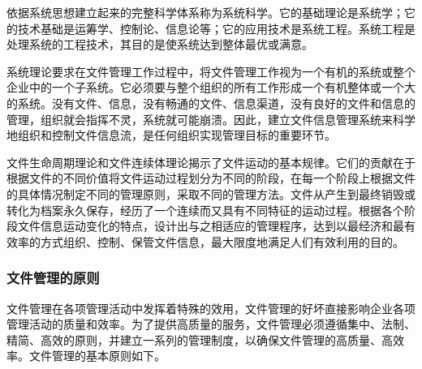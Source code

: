     依据系统思想建立起来的完整科学体系称为系统科学。它的基础理论是系统学；它的技术基础是运筹学、控制论、信息论等；它的应用技术是系统工程。系统工程是处理系统的工程技术，其目的是使系统达到整体最优或满意。

    系统理论要求在文件管理工作过程中，将文件管理工作视为一个有机的系统或整个企业中的一个子系统。它必须要与整个组织的所有工作形成一个有机整体或一个大的系统。没有文件、信息，没有畅通的文件、信息渠道，没有良好的文件和信息的管理，组织就会指挥不灵，系统就可能崩溃。因此，建立文件信息管理系统来科学地组织和控制文件信息流，是任何组织实现管理目标的重要环节。

    文件生命周期理论和文件连续体理论揭示了文件运动的基本规律。它们的贡献在于根据文件的不同价值将文件运动过程划分为不同的阶段，在每一个阶段上根据文件的具体情况制定不同的管理原则，采取不同的管理方法。文件从产生到最终销毁或转化为档案永久保存，经历了一个连续而又具有不同特征的运动过程。根据各个阶段文件信息运动变化的特点，设计出与之相适应的管理程序，达到以最经济和最有效率的方式组织、控制、保管文件信息，最大限度地满足人们有效利用的目的。

    \subsubsection {文件管理的原则}

    文件管理在各项管理活动中发挥着特殊的效用，文件管理的好坏直接影响企业各项管理活动的质量和效率。为了提供高质量的服务，文件管理必须遵循集中、法制、精简、高效的原则，并建立一系列的管理制度，以确保文件管理的高质量、高效率。文件管理的基本原则如下。

